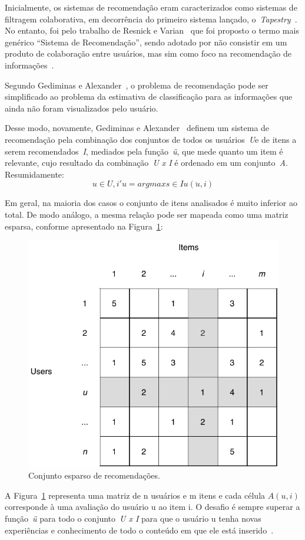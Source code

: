 \documentclass{svproc}
\begin{document}
Inicialmente, os sistemas de recomendação eram caracterizados como sistemas de filtragem colaborativa, em decorrência do primeiro sistema lançado, o~\emph{Tapestry}~\cite{goldberg1992using,resnick1994grouplens,medeiros2013estudo}. 
No entanto, foi pelo trabalho de Resnick e Varian~\cite{resnick1997recommender} que foi proposto o termo mais genérico ``Sistema de Recomendação'', sendo adotado por
não consistir em um produto de colaboração entre usuários, mas sim como foco na recomendação de informações~\cite{adomavicius2005toward,medeiros2013estudo}.

Segundo Gediminas e Alexander~\cite{adomavicius2005toward}, o problema de recomendação pode ser simplificado ao
problema da estimativa de classificação para as informações que ainda não foram
visualizados pelo usuário.

Desse modo, novamente, Gediminas e Alexander~\cite{adomavicius2005toward} definem um sistema de recomendação pela combinação dos conjuntos de todos os usuários~\emph{U}e de itens a serem recomendados~\emph{I}, mediados pela função~\emph{ü}, que mede quanto um item é relevante, cujo resultado da combinação~\emph{U x I} é ordenado em um conjunto~\emph{A}.
Resumidamente: 
$$u \in U, i'u = argmaxs \in Iu(\ddot u, i)$$

Em geral, na maioria dos casos o conjunto de itens analisados é muito inferior ao total. 
De modo análogo, a mesma relação pode ser mapeada como uma matriz esparsa, conforme apresentado na Figura~\ref{figure:esparsa}:

\begin{figure}[!ht]
\centering
\includegraphics[width=.6\textwidth]{images/esparsa.pdf}
\caption{Conjunto esparso de recomendações.}
\label{figure:esparsa}
\end{figure}

A Figura~\ref{figure:esparsa} representa uma matriz de n usuários e m itens e cada célula $A(u,i)$ corresponde à uma avaliação do usuário u ao item i. 
O desafio é sempre superar a função~\emph{ü} para todo o conjunto~\emph{U x I} para que o usuário u tenha novas experiências e conhecimento de todo o conteúdo em que ele está inserido~\cite{adomavicius2005toward}.
\end{document}
